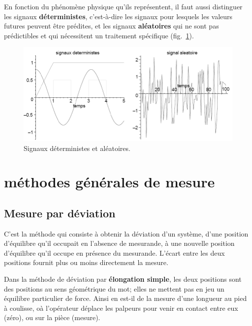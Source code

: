 \newpage
En fonction du phénomène physique qu'ils représentent, il faut aussi distinguer les signaux \textbf{déterministes}, c'est-à-dire les signaux pour lesquels les valeurs futures peuvent être prédites, et les signaux \textbf{aléatoires} qui ne sont pas prédictibles et qui nécessitent un traitement spécifique (fig.~\ref{fig:sigda}).
\begin{figure}[h]
   \centering
   \includegraphics[width=16cm]{assets/figures/sigda.pdf}
   \caption{Signaux déterministes et aléatoires.}
   \label{fig:sigda}
\end{figure}

\section{méthodes générales de mesure}

\subsection{Mesure par déviation}

C'est la méthode qui consiste à obtenir la déviation d'un système, d'une position d'équilibre qu'il occupait en l'absence de mesurande, à une nouvelle position d'équilibre qu'il occupe en présence du mesurande.  L'écart entre les deux positions fournit plus ou moins directement la mesure.

Dans la méthode de déviation par \textbf{élongation simple}, les deux positions sont des positions au sens géométrique du mot; elles ne mettent pas en jeu un équilibre particulier de force. Ainsi en est-il de la mesure d'une longueur au pied à coulisse, oà l'opérateur déplace les palpeurs pour venir en contact entre eux (zéro), ou sur la pièce (mesure).

